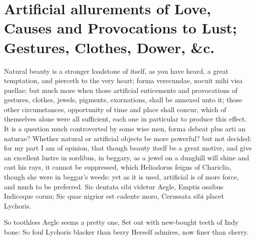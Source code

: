 {%
\section[Artificial allures of Love]{Artificial allurements of Love, Causes and Provocations to Lust; Gestures, Clothes, Dower, \&c.}

Natural beauty is a stronger loadstone of itself, as you have heard, a
great temptation, and pierceth to the very heart; forma
verecundae, nocuit mihi visa puellae; but much more when those
artificial enticements and provocations of gestures, clothes, jewels,
pigments, exornations, shall be annexed unto it; those other
circumstances, opportunity of time and place shall concur, which of
themselves alone were all sufficient, each one in particular to produce
this effect. It is a question much controverted by some wise men, forma
debeat plus arti an naturae? Whether natural or artificial objects be
more powerful? but not decided: for my part I am of opinion, that
though beauty itself be a great motive, and give an excellent lustre in
sordibus, in beggary, as a jewel on a dunghill will shine and cast his
rays, it cannot be suppressed, which Heliodorus feigns of Chariclia,
though she were in beggar's weeds: yet as it is used, artificial is of
more force, and much to be preferred.
Sic dentata sibi videtur Aegle,
Emptis ossibus Indicoque cornu;
Sic quae nigrior est cadente moro,
Cerussata sibi placet Lychoris.

So toothless Aegle seems a pretty one,
Set out with new-bought teeth of Indy bone:
So foul Lychoris blacker than berry
Herself admires, now finer than cherry.

}
